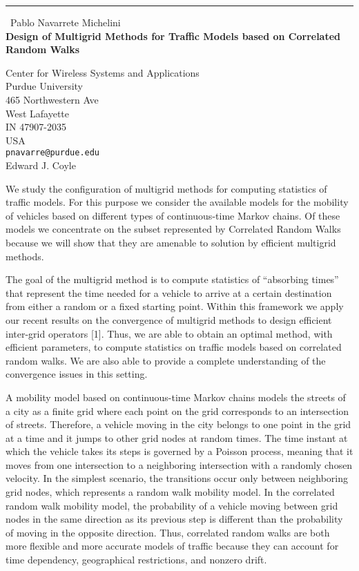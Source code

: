 \documentclass{report}
\begin{document}
\begin{center}
\rule{6in}{1pt} \
{\large Pablo Navarrete Michelini \\
{\bf Design of Multigrid Methods for Traffic Models based on Correlated Random Walks}}

Center for Wireless Systems and Applications \\ Purdue University \\ 465 Northwestern Ave \\ West Lafayette \\ IN 47907-2035 \\ USA
\\
{\tt pnavarre@purdue.edu}\\
Edward J. Coyle\end{center}

We study the configuration of multigrid methods for computing statistics
of traffic models. For this purpose we consider the available models for
the mobility of vehicles based on different types of continuous-time
Markov chains. Of these models we concentrate on the subset represented
by Correlated Random Walks because we will show that they are amenable to
solution by efficient multigrid methods.

The goal of the multigrid method is to compute statistics of ``absorbing
times'' that represent the time needed for a vehicle to arrive at a
certain destination from either a random or a fixed starting point.
Within this framework we apply our recent results on the convergence of
multigrid methods to design efficient inter-grid operators [1]. Thus, we
are able to obtain an optimal method, with efficient parameters, to
compute statistics on traffic models based on correlated random walks. We
are also able to provide a complete understanding of the convergence
issues in this setting.

A mobility model based on continuous-time Markov chains models the
streets of a city as a finite grid where each point on the grid
corresponds to an intersection of streets. Therefore, a vehicle moving in
the city belongs to one point in the grid at a time and it jumps to other
grid nodes at random times. The time instant at which the vehicle takes
its steps is governed by a Poisson process, meaning that it moves from
one intersection to a neighboring intersection with a randomly chosen
velocity. In the simplest scenario, the transitions occur only between
neighboring grid nodes, which represents a random walk mobility model. In
the correlated random walk mobility model, the probability of a vehicle
moving between grid nodes in the same direction as its previous step is
different than the probability of moving in the opposite direction. Thus,
correlated random walks are both more flexible and more accurate models
of traffic because they can account for time dependency, geographical
restrictions, and nonzero drift.
\end{document}
